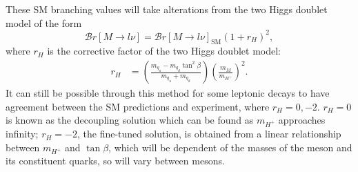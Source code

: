 \documentclass[a4paper,12pt]{article}
\begin{document}
These SM branching values will take alterations from the two Higgs doublet model of the form
\begin{equation}
    \label{eq:mesrh}
    \mathcal{B}r[M\to l\nu] = \mathcal{B}r[M\to l\nu]_{\text{SM}}(1+r_H)^2,
\end{equation}
where $r_H$ is the corrective factor of the two Higgs doublet model:
\begin{align}
    \label{eq:rh}
    r_H &= \left(\frac{m_{q_u}-m_{q_d}\tan^2\beta}{m_{q_u}+m_{q_d}}\right)\left(\frac{m_M}{m_{H^+}}\right)^2.
\end{align}
It can still be possible through this method for some leptonic decays to have agreement between the SM predictions and experiment, where $r_H = 0,-2$.
$r_H=0$ is known as the decoupling solution which can be found as $m_{H^+}$ approaches infinity; $r_H=-2$, the fine-tuned solution, is obtained from a linear relationship between $m_{H^+}$ and $\tan\beta$, which will be dependent of the masses of the meson and its constituent quarks, so will vary between mesons. 
\end{document}
